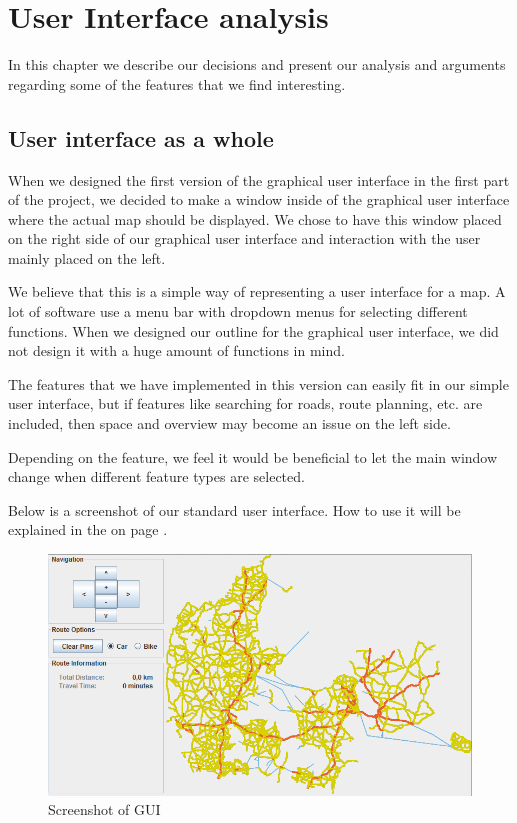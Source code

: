 \chapter{User Interface analysis}
\label{UIA}
In this chapter we describe our decisions and present our analysis and
arguments regarding some of the features that we find interesting.

\section{User interface as a whole}
\label{UIA-UIW}
When we designed the first version of the graphical user interface in the first
part of the project, we decided to make a window inside of the graphical user
interface where the actual map should be displayed. We chose to have this
window placed on the right side of our graphical user interface and interaction
with the user mainly placed on the left.

We believe that this is a simple way of representing a user interface for a map.
A lot of software use a menu bar with dropdown menus for selecting different
functions. When we designed our outline for the graphical user interface, we did
not design it with a huge amount of functions in mind. 

The features that we have implemented in this version can easily fit in our
simple user interface, but if features like searching for roads, route planning,
etc. are included, then space and overview may become an issue on the left side.

Depending on the feature, we feel it would be beneficial to let the main window
change when different feature types are selected.

Below is a screenshot of our standard user interface. How to use it will be
explained in the  on page \pageref{MAN}.

\begin{figure}[!ht]
\centering
\includegraphics[width=0.5\linewidth]{images/PictureOfUI}
\caption{Screenshot of GUI}
\label{UIA-UIW-PIC}
\end{figure}

